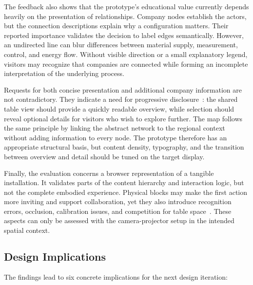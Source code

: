 \documentclass[sigconf,nonacm]{acmart}
\begin{document}
The feedback also shows that the prototype's educational value currently depends heavily on the presentation of relationships. Company nodes establish the actors, but the connection descriptions explain why a configuration matters. Their reported importance validates the decision to label edges semantically. However, an undirected line can blur differences between material supply, measurement, control, and energy flow. Without visible direction or a small explanatory legend, visitors may recognize that companies are connected while forming an incomplete interpretation of the underlying process.

Requests for both concise presentation and additional company information are not contradictory. They indicate a need for progressive disclosure~\cite{shneiderman1996}: the shared table view should provide a quickly readable overview, while selection should reveal optional details for visitors who wish to explore further. The map follows the same principle by linking the abstract network to the regional context without adding information to every node. The prototype therefore has an appropriate structural basis, but content density, typography, and the transition between overview and detail should be tuned on the target display.

Finally, the evaluation concerns a browser representation of a tangible installation. It validates parts of the content hierarchy and interaction logic, but not the complete embodied experience. Physical blocks may make the first action more inviting and support collaboration, yet they also introduce recognition errors, occlusion, calibration issues, and competition for table space~\cite{newton2003}. These aspects can only be assessed with the camera-projector setup in the intended spatial context.

\subsection{Design Implications}

The findings lead to six concrete implications for the next design iteration:
\end{document}
